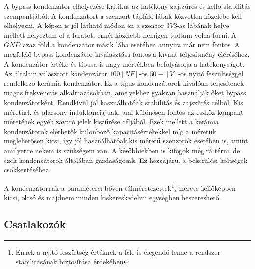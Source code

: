 A bypass kondenzátor elhelyezése kritikus az hatékony zajszűrés és kellő stabilitás szempontjából. A kondenzátort a szenzort tápláló lábak közvetlen közelébe kell elhelyezni. A képen is jól látható módon én a szenzor $3V3$-as lábának helye mellett helyeztem el a furatot, ennél közelebb nemigen tudtam volna fúrni. A $GND$ azaz föld a kondenzátor másik lába esetében annyira már nem fontos. A megfelelő bypass kondenzátor kiválasztása fontos a kívánt teljesítmény eléréséhez. A kondenzátor értéke és típusa is nagy mértékben befolyásolja a hatékonyságot. Az általam választott kondenzátor $100[NF]$-os $50-[V]$-os nyitó feszültséggel rendelkező kerámia kondenzátor. Ez a típus kondenzátorok kiválóan teljesítenek magas frekvenciás alkalmazásokban, amelyekhez gyakran használják őket bypass kondenzátorként. Rendkívül jól használhatóak stabilitás és zajszűrés célból. Kis méretűek és alacsony induktanciájúak, ami különösen fontos az eszköz kompakt méretének egyéb zavaró jelek kiszűrése céljából. Ezek mellett a kerámia kondenzátorok elérhetők különböző kapacitásértékekkel míg a méretük meglehetősen kicsi, így jól használhatóak kis méretű szenzorok esetében is, amint amilyenre nekem is szükségem van. A későbbiekben is kifogok még rá térni, de ezek kondenzátorok általában gazdaságosak. Ez hozzájárul a bekerülési költségek csökkentéséhez.

A kondenzátornak a paraméterei bőven túlméretezettek\footnote{Ennek a nyitó feszültség értéknek a fele is elegendő lenne a rendszer stabilitásának biztosítása érdekében}, mérete kellőképpen kicsi, olcsó és majdnem minden kiskereskedelmi egységben beszerezhető.

\subsection{Csatlakozók}

